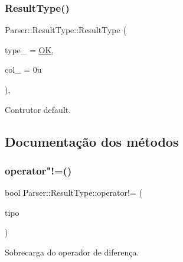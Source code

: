 \subsubsection{\texorpdfstring{Result\+Type()}{ResultType()}}
{\footnotesize\ttfamily Parser\+::\+Result\+Type\+::\+Result\+Type (\begin{DoxyParamCaption}\item[{\hyperlink{structParser_1_1ResultType_ac63a3ce34d7a6a119b1902372116d457}{code\+\_\+t}}]{type\+\_\+ = {\ttfamily \hyperlink{structParser_1_1ResultType_ac63a3ce34d7a6a119b1902372116d457a0125be86217a5d0cdad8f818c7e2fde0}{OK}},  }\item[{\hyperlink{structParser_1_1ResultType_a8f110ce090aad3f4016d241aaef768db}{size\+\_\+type}}]{col\+\_\+ = {\ttfamily 0u} }\end{DoxyParamCaption})\hspace{0.3cm}{\ttfamily [inline]}, {\ttfamily [explicit]}}



Contrutor default. 



\subsection{Documentação dos métodos}
\mbox{\label{structParser_1_1ResultType_a1e2c9f1eaa6bce1b8be87572d21546ec}} 
\subsubsection{\texorpdfstring{operator"!=()}{operator!=()}}
{\footnotesize\ttfamily bool Parser\+::\+Result\+Type\+::operator!= (\begin{DoxyParamCaption}\item[{\hyperlink{structParser_1_1ResultType}{Result\+Type}}]{tipo }\end{DoxyParamCaption})\hspace{0.3cm}{\ttfamily [inline]}}



Sobrecarga do operador de diferença. 

\mbox{\label{structParser_1_1ResultType_a42567f764f3d1ffebdac55aad576f102}} 
